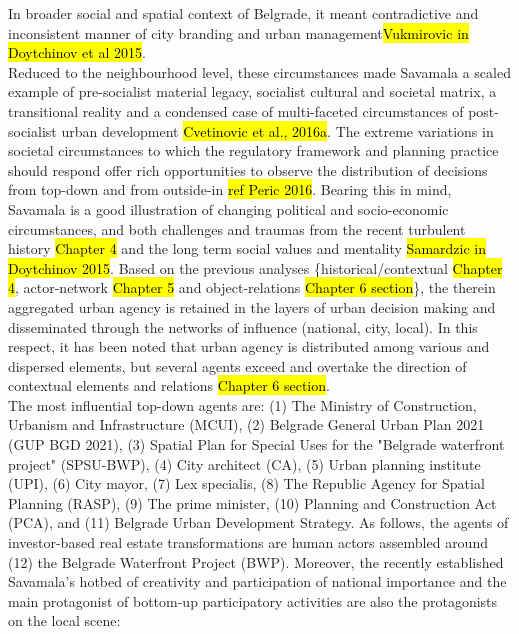 \documentclass[11pt]{report}
\begin{document}
In broader social and spatial context of Belgrade, it meant contradictive and inconsistent manner of city branding and urban management\hl{Vukmirovic in Doytchinov et al 2015}.
\\
Reduced to the neighbourhood level, these circumstances made Savamala a scaled example of pre-socialist material legacy, socialist cultural and societal matrix, a transitional reality and a condensed case of multi-faceted circumstances of post-socialist urban development \hl{Cvetinovic et al., 2016a}.
The extreme variations in societal circumstances to which the regulatory framework and planning practice should respond offer rich opportunities to observe the distribution of decisions from top-down and from outside-in \hl{ref Peric 2016}.
Bearing this in mind, Savamala is a good illustration of changing political and socio-economic circumstances, and both challenges and  traumas from the recent turbulent history \hl{Chapter 4} and the long term social values and mentality \hl{Samardzic in Doytchinov 2015}.\footnotemark
Based on the previous analyses \{historical/contextual \hl{Chapter 4}, actor-network \hl{Chapter 5} and object-relations \hl{Chapter 6 section}\}, the therein aggregated urban agency is retained in the layers of urban decision making and disseminated through the networks of influence (national, city, local).
In this respect, it has been noted that urban agency is distributed among various and dispersed elements, but several agents exceed and overtake the direction of contextual elements and relations \hl{Chapter 6 section}.
\\
The most influential top-down agents are: 
(1) The Ministry of Construction, Urbanism and Infrastructure (MCUI), 
(2) Belgrade General Urban Plan 2021 (GUP BGD 2021), 
(3) Spatial Plan for Special Uses for the "Belgrade waterfront project" (SPSU-BWP),
(4) City architect (CA),
(5) Urban planning institute (UPI),
(6) City mayor,
(7) Lex specialis,
(8) The Republic Agency for Spatial Planning (RASP),
(9) The prime minister,
(10) Planning and Construction Act (PCA),
and (11) Belgrade Urban Development Strategy.
As follows, the agents of investor-based real estate transformations are human actors assembled around
(12) the Belgrade Waterfront Project (BWP). Moreover, the recently established Savamala's hotbed of creativity and participation of national importance and the main protagonist of bottom-up participatory activities are also the protagonists on the local scene: 
\end{document}
